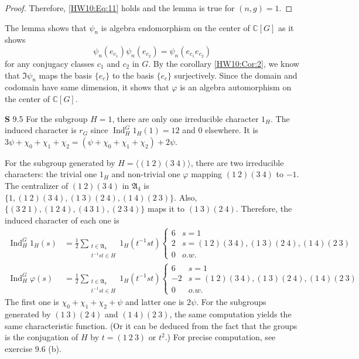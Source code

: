 \documentclass[a4paper, 12pt]{article}
\theoremstyle{Mydefinition}
\theoremstyle{Mytheorem}
\DeclareMathOperator{\Ind}{Ind}
\begin{document}
\begin{enumerate}
\begin{proof}
Therefore, \eqref{HW10:Eq:11} holds and the lemma is true for $(n,g)=1$.
\end{proof}
The lemma shows that $\psi_n$ is algebra endomorphism on the center of $\mathbb{C}[G]$ as it shows
\begin{equation}
    \psi_n(e_{c_1})\psi_n(e_{c_2}) = \psi_n(e_{c_1}e_{c_2})
\end{equation}
for any conjugacy classes $c_1$ and $c_2$ in $G$. By the corollary \ref{HW10:Cor:2}, we know that $\Im\psi_n$ maps the basis $\{e_c\}$ to the basis $\{e_c\}$ surjectively. Since the domain and codomain have same dimension, it shows that $\varphi$ is an algebra automorphism on the center of $\mathbb{C}[G]$. 
\end{enumerate}

\noindent \textbf{S} 9.5
For the subgroup $H=1$, there are only one irreducible character $1_H$. The induced character is $r_G$ since $\Ind_H^G 1_H(1)=12$ and $0$ elsewhere. It is $3\psi + \chi_0+\chi_1+\chi_2 =(\psi + \chi_0+\chi_1+\chi_2)+2\psi$.

For the subgroup generated by $H=\langle (1~2)(3~4)\rangle $, there are two irreducible characters: the trivial one $1_H$ and non-trivial one $\varphi$ mapping $(1~2)(3~4)$ to $-1$. The centralizer of $(1~2)(3~4)$ in $\mathfrak{A}_4$ is $\{1, (1~2)(3~4),(1~3)(2~4),(1~4)(2~3)\}$. Also, $\{(3~2~1), (1~2~4), (4~3~1), (2~3~4)\}$ maps it to $(1~3)(2~4)$. Therefore, the induced character of each one is
\begin{equation}
\begin{split}
    \Ind_H^G 1_H(s) &=\frac{1}{2}\sum_{\substack{t\in \mathfrak{A}_4\\t^{-1}st\in H}} 1_H(t^{-1}st)\begin{cases}
    6 & s=1\\
    2 & s=(1~2)(3~4), (1~3)(2~4), (1~4)(2~3)\\
    0 & o.w.
    \end{cases}\\
    \Ind_H^G \varphi(s) &=\frac{1}{2}\sum_{\substack{t\in \mathfrak{A}_4\\t^{-1}st\in H}} 1_H(t^{-1}st)\begin{cases}
    6 & s=1\\
    -2 & s=(1~2)(3~4), (1~3)(2~4), (1~4)(2~3)\\
    0 & o.w.
    \end{cases}
\end{split}
\end{equation}
The first one is $\chi_0+\chi_1+\chi_2+\psi$ and latter one is $2\psi$. For the subgroups generated by $(1~3)(2~4)$ and $(1~4)(2~3)$, the same computation yields the same characteristic function. (Or it can be deduced from the fact that the groups is the conjugation of $H$ by $t=(1~2~3)$ or $t^2$.) For precise computation, see exercise 9.6 (b).
\end{document}
